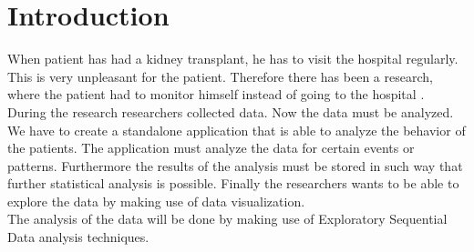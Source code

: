 \section{Introduction}
When patient has had a kidney transplant, he has to visit the hospital regularly. This is very unpleasant for the patient. Therefore there has been a research, where the patient had to monitor himself instead of going to the hospital \cite{Admire} \cite{Admire2}. During the research researchers collected data. Now the data must be analyzed.\\
We have to create a standalone application that is able to analyze the behavior of the patients. The application must analyze the data for certain events or patterns. Furthermore the results of the analysis must be stored in such way that further statistical analysis is possible. Finally the researchers wants to be able to explore the data by making use of data visualization. \\
The analysis of the data will be done by making use of Exploratory Sequential Data analysis techniques\cite{esda}. 
